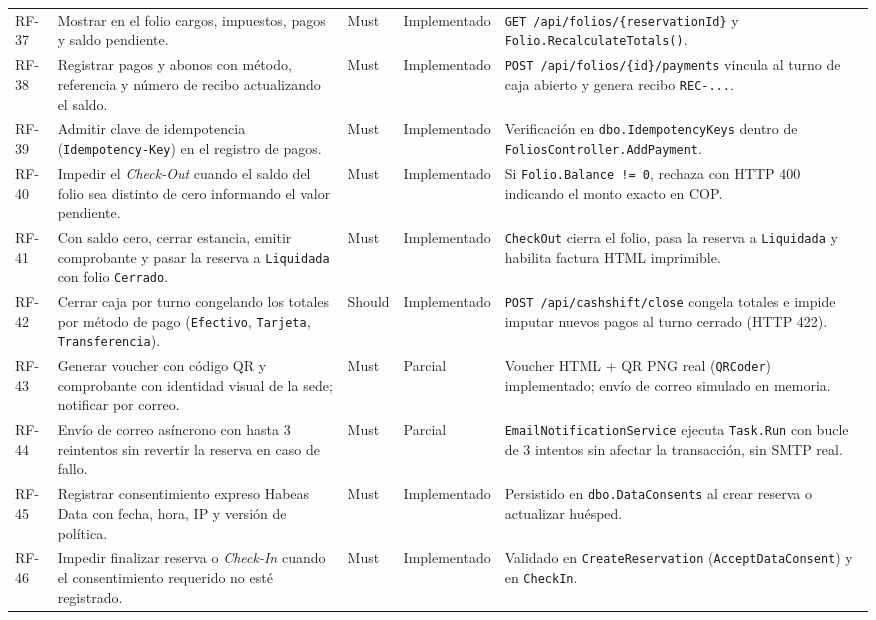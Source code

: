 \documentclass[12pt,a4paper]{article}
\begin{document}
\begin{longtable}{p{1.3cm} p{5.2cm} p{1.3cm} p{2.2cm} p{4.4cm}}
RF-37 & Mostrar en el folio cargos, impuestos, pagos y saldo pendiente. & Must & Implementado & \texttt{GET /api/folios/\{reservationId\}} y \texttt{Folio.RecalculateTotals()}.\\[0.1cm]
RF-38 & Registrar pagos y abonos con m\'etodo, referencia y n\'umero de recibo actualizando el saldo. & Must & Implementado & \texttt{POST /api/folios/\{id\}/payments} vincula al turno de caja abierto y genera recibo \texttt{REC-...}.\\[0.1cm]
RF-39 & Admitir clave de idempotencia (\texttt{Idempotency-Key}) en el registro de pagos. & Must & Implementado & Verificaci\'on en \texttt{dbo.IdempotencyKeys} dentro de \texttt{FoliosController.AddPayment}.\\[0.1cm]
RF-40 & Impedir el \textit{Check-Out} cuando el saldo del folio sea distinto de cero informando el valor pendiente. & Must & Implementado & Si \texttt{Folio.Balance != 0}, rechaza con HTTP 400 indicando el monto exacto en COP.\\[0.1cm]
RF-41 & Con saldo cero, cerrar estancia, emitir comprobante y pasar la reserva a \texttt{Liquidada} con folio \texttt{Cerrado}. & Must & Implementado & \texttt{CheckOut} cierra el folio, pasa la reserva a \texttt{Liquidada} y habilita factura HTML imprimible.\\[0.1cm]
RF-42 & Cerrar caja por turno congelando los totales por m\'etodo de pago (\texttt{Efectivo}, \texttt{Tarjeta}, \texttt{Transferencia}). & Should & Implementado & \texttt{POST /api/cashshift/close} congela totales e impide imputar nuevos pagos al turno cerrado (HTTP 422).\\[0.1cm]
RF-43 & Generar voucher con c\'odigo QR y comprobante con identidad visual de la sede; notificar por correo. & Must & Parcial & Voucher HTML + QR PNG real (\texttt{QRCoder}) implementado; env\'io de correo simulado en memoria.\\[0.1cm]
RF-44 & Env\'io de correo as\'incrono con hasta 3 reintentos sin revertir la reserva en caso de fallo. & Must & Parcial & \texttt{EmailNotificationService} ejecuta \texttt{Task.Run} con bucle de 3 intentos sin afectar la transacci\'on, sin SMTP real.\\[0.1cm]
RF-45 & Registrar consentimiento expreso Habeas Data con fecha, hora, IP y versi\'on de pol\'itica. & Must & Implementado & Persistido en \texttt{dbo.DataConsents} al crear reserva o actualizar hu\'esped.\\[0.1cm]
RF-46 & Impedir finalizar reserva o \textit{Check-In} cuando el consentimiento requerido no est\'e registrado. & Must & Implementado & Validado en \texttt{CreateReservation} (\texttt{AcceptDataConsent}) y en \texttt{CheckIn}.\\[0.1cm]

\end{longtable}
\end{document}
